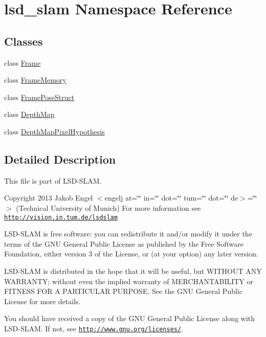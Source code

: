 \hypertarget{namespacelsd__slam}{\section{lsd\-\_\-slam Namespace Reference}
\label{namespacelsd__slam}
}
\subsection*{Classes}
\begin{DoxyCompactItemize}
\item 
class \hyperlink{classlsd__slam_1_1_frame}{Frame}
\item 
class \hyperlink{classlsd__slam_1_1_frame_memory}{Frame\-Memory}
\item 
class \hyperlink{classlsd__slam_1_1_frame_pose_struct}{Frame\-Pose\-Struct}
\item 
class \hyperlink{classlsd__slam_1_1_depth_map}{Depth\-Map}
\item 
class \hyperlink{classlsd__slam_1_1_depth_map_pixel_hypothesis}{Depth\-Map\-Pixel\-Hypothesis}
\end{DoxyCompactItemize}


\subsection{Detailed Description}
This file is part of L\-S\-D-\/\-S\-L\-A\-M.

Copyright 2013 Jakob Engel $<$engelj at=\char`\"{}\char`\"{} in=\char`\"{}\char`\"{} dot=\char`\"{}\char`\"{} tum=\char`\"{}\char`\"{} dot=\char`\"{}\char`\"{} de$>$=\char`\"{}\char`\"{}$>$ (Technical University of Munich) For more information see \href{http://vision.in.tum.de/lsdslam}{\tt http\-://vision.\-in.\-tum.\-de/lsdslam}

L\-S\-D-\/\-S\-L\-A\-M is free software\-: you can redistribute it and/or modify it under the terms of the G\-N\-U General Public License as published by the Free Software Foundation, either version 3 of the License, or (at your option) any later version.

L\-S\-D-\/\-S\-L\-A\-M is distributed in the hope that it will be useful, but W\-I\-T\-H\-O\-U\-T A\-N\-Y W\-A\-R\-R\-A\-N\-T\-Y; without even the implied warranty of M\-E\-R\-C\-H\-A\-N\-T\-A\-B\-I\-L\-I\-T\-Y or F\-I\-T\-N\-E\-S\-S F\-O\-R A P\-A\-R\-T\-I\-C\-U\-L\-A\-R P\-U\-R\-P\-O\-S\-E. See the G\-N\-U General Public License for more details.

You should have received a copy of the G\-N\-U General Public License along with L\-S\-D-\/\-S\-L\-A\-M. If not, see \href{http://www.gnu.org/licenses/}{\tt http\-://www.\-gnu.\-org/licenses/}. 